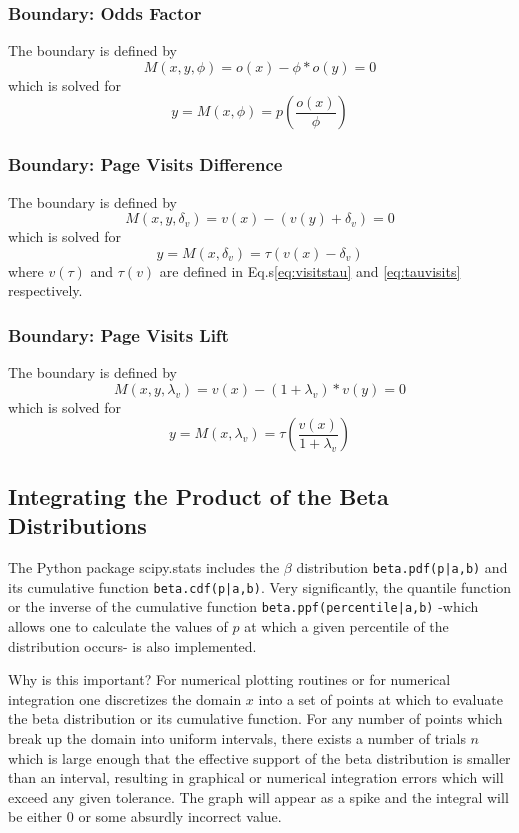 \documentclass[12pt]{report}
\newcommand{\beq}{\begin{equation}} %
\newcommand{\eeq}{\end{equation}} %
\begin{document}
\subsubsection{Boundary: Odds Factor}
The boundary is defined by
\beq
M(x,y,\phi) = o(x)-\phi *o(y) =0
\eeq
which is solved for
\beq
y=M(x,\phi) = p\left(\frac{o(x)}{\phi}\right)
\eeq

\subsubsection{Boundary: Page Visits Difference}
The boundary is defined by
\beq
M(x,y,\delta_v) = v(x)-(v(y)+\delta_v) =0
\eeq
which is solved for
\beq
y=M(x,\delta_v) = \tau(v(x)-\delta_v)
\eeq
where \(v(\tau)\) and \(\tau(v)\) are defined in Eq.s\ref{eq:visitstau} and \ref{eq:tauvisits} respectively. 

\subsubsection{Boundary: Page Visits Lift}
The boundary is defined by
\beq
M(x,y,\lambda_v) = v(x)-(1+\lambda_v)*v(y) =0
\eeq
which is solved for
\beq
y=M(x,\lambda_v) = \tau\left(\frac{v(x)}{1+\lambda_v}\right)
\eeq

\subsection{Integrating the Product of the Beta Distributions}
The Python package scipy.stats includes the \(\beta\) distribution
{\tt beta.pdf(p|a,b)} and its cumulative function {\tt beta.cdf(p|a,b)}. Very
significantly, the quantile function or the inverse of the cumulative function
{\tt beta.ppf(percentile|a,b)} -which allows one to calculate the values of
\(p\) at which a given percentile of the distribution occurs- is also
implemented.

Why is this important? For numerical plotting routines or for numerical
integration one discretizes the domain \(x\) into a set of points at which to
evaluate the beta distribution or its cumulative function.
For any number of points which break up the domain into uniform intervals,
there exists a number of trials \(n\) which is large enough that the effective
support of the beta distribution is smaller than an interval, resulting
in graphical or numerical integration errors which will exceed any given
tolerance. The graph will appear as a spike and the integral will be either 0
or some absurdly incorrect value.
\end{document}
